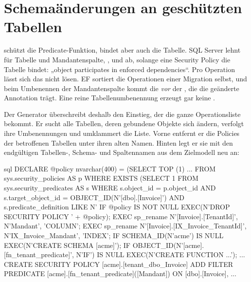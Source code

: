 \section{Schemaänderungen an geschützten Tabellen}\label{sec:sqlserver-schema-bound-changes}

 schützt die Predicate-Funktion, bindet aber auch die Tabelle. SQL Server
lehnt  für Tabelle und Mandantenspalte, ,  und 
ab, solange eine Security Policy die Tabelle bindet: „object participates in enforced
dependencies“. Pro Operation lässt sich das nicht lösen. EF sortiert die Operationen einer
Migration selbst, und beim Umbenennen der Mandantenspalte kommt die
 \emph{vor} der
, die die geänderte Annotation trägt. Eine
reine Tabellenumbenennung erzeugt gar keine .

Der Generator überschreibt deshalb den Einstieg, der die ganze Operationsliste bekommt. Er
sucht alle Tabellen, deren gebundene Objekte sich ändern, verfolgt ihre Umbenennungen und
umklammert die Liste. Vorne entfernt er die Policies der betroffenen Tabellen unter ihren alten
Namen. Hinten legt er sie mit den endgültigen Tabellen-, Schema- und Spaltennamen aus dem
Zielmodell neu an:

\begin{sourcecode}{sql}
DECLARE @policy nvarchar(400) = (SELECT TOP (1) ... FROM sys.security_policies AS p
    WHERE EXISTS (SELECT 1 FROM sys.security_predicates AS s WHERE s.object_id = p.object_id
        AND s.target_object_id = OBJECT_ID(N'[dbo].[Invoice]')
        AND s.predicate_definition LIKE N'%
IF @policy IS NOT NULL EXEC(N'DROP SECURITY POLICY ' + @policy);
EXEC sp_rename N'[Invoice].[TenantId]', N'Mandant', 'COLUMN';
EXEC sp_rename N'[Invoice].[IX_Invoice_TenantId]', N'IX_Invoice_Mandant', 'INDEX';
IF SCHEMA_ID(N'acme') IS NULL EXEC(N'CREATE SCHEMA [acme]');
IF OBJECT_ID(N'[acme].[fn_tenant_predicate]', N'IF') IS NULL EXEC(N'CREATE FUNCTION ...');
...
CREATE SECURITY POLICY [acme].[tenant_dbo_Invoice]
    ADD FILTER PREDICATE [acme].[fn_tenant_predicate]([Mandant]) ON [dbo].[Invoice], ...
\end{sourcecode}

